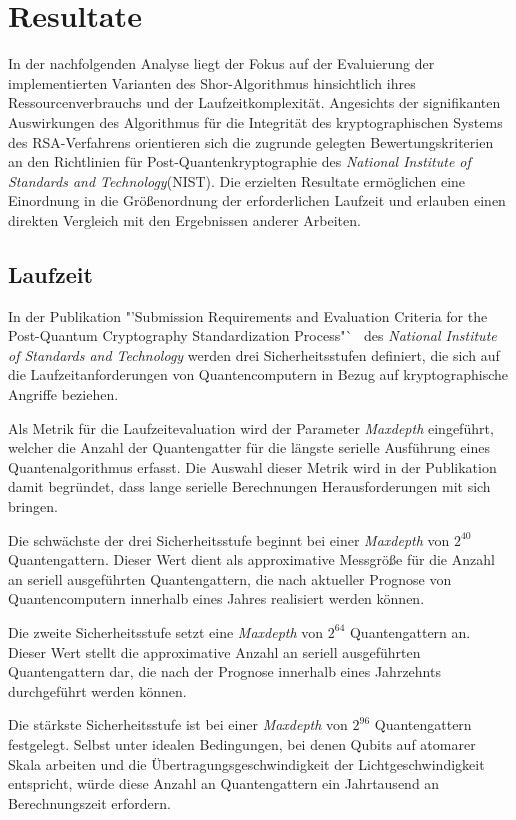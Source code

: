 \section{Resultate}
In der nachfolgenden Analyse liegt der Fokus auf der Evaluierung der implementierten Varianten des Shor-Algorithmus hinsichtlich ihres Ressourcenverbrauchs und 
der Laufzeitkomplexität. 
Angesichts der signifikanten Auswirkungen des Algorithmus für die Integrität des kryptographischen Systems des RSA-Verfahrens  
orientieren sich die zugrunde gelegten Bewertungskriterien an den Richtlinien für Post-Quantenkryptographie des \textit{National Institute of Standards and Technology}(NIST). 
Die erzielten Resultate ermöglichen eine Einordnung in die Größenordnung der erforderlichen Laufzeit und 
erlauben einen direkten Vergleich mit den Ergebnissen anderer Arbeiten.

\subsection*{Laufzeit}
In der Publikation "'Submission Requirements and Evaluation Criteria for the Post-Quantum Cryptography Standardization Process"`~\cite{NISTPQC} des \textit{National Institute of Standards and Technology}
werden drei Sicherheitsstufen definiert, die sich auf die Laufzeitanforderungen von Quantencomputern in Bezug auf kryptographische Angriffe beziehen.

Als Metrik für die Laufzeitevaluation wird der Parameter \textit{Maxdepth} eingeführt, 
welcher die Anzahl der Quantengatter für die längste serielle Ausführung eines Quantenalgorithmus erfasst.
Die Auswahl dieser Metrik wird in der Publikation damit begründet, dass lange serielle Berechnungen Herausforderungen mit sich bringen.

Die schwächste der drei Sicherheitsstufe beginnt bei einer \textit{Maxdepth} von \(2^{40}\) Quantengattern. 
Dieser Wert dient als approximative Messgröße für die Anzahl an seriell ausgeführten Quantengattern, 
die nach aktueller Prognose von Quantencomputern innerhalb eines Jahres realisiert werden können.

Die zweite Sicherheitsstufe setzt eine \textit{Maxdepth} von \(2^{64}\) Quantengattern an.
Dieser Wert stellt die approximative Anzahl an seriell ausgeführten Quantengattern dar, 
die nach der Prognose innerhalb eines Jahrzehnts durchgeführt werden können.

Die stärkste Sicherheitsstufe ist bei einer \textit{Maxdepth} von \(2^{96}\) Quantengattern festgelegt. 
Selbst unter idealen Bedingungen, 
bei denen Qubits auf atomarer Skala arbeiten und die Übertragungsgeschwindigkeit der Lichtgeschwindigkeit entspricht, 
würde diese Anzahl an Quantengattern ein Jahrtausend an Berechnungszeit erfordern.


